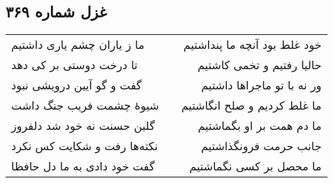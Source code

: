 \begin{center}
\section*{غزل شماره ۳۶۹}
\label{sec:sh369}
\begin{longtable}{l p{0.5cm} r}
ما ز یاران چشم یاری داشتیم
&&
خود غلط بود آنچه ما پنداشتیم
\\
تا درخت دوستی بر کی دهد
&&
حالیا رفتیم و تخمی کاشتیم
\\
گفت و گو آیین درویشی نبود
&&
ور نه با تو ماجراها داشتیم
\\
شیوهٔ چشمت فریب جنگ داشت
&&
ما غلط کردیم و صلح انگاشتیم
\\
گلبن حسنت نه خود شد دلفروز
&&
ما دم همت بر او بگماشتیم
\\
نکته‌ها رفت و شکایت کس نکرد
&&
جانب حرمت فرونگذاشتیم
\\
گفت خود دادی به ما دل حافظا
&&
ما محصل بر کسی نگماشتیم
\\
\end{longtable}
\end{center}

